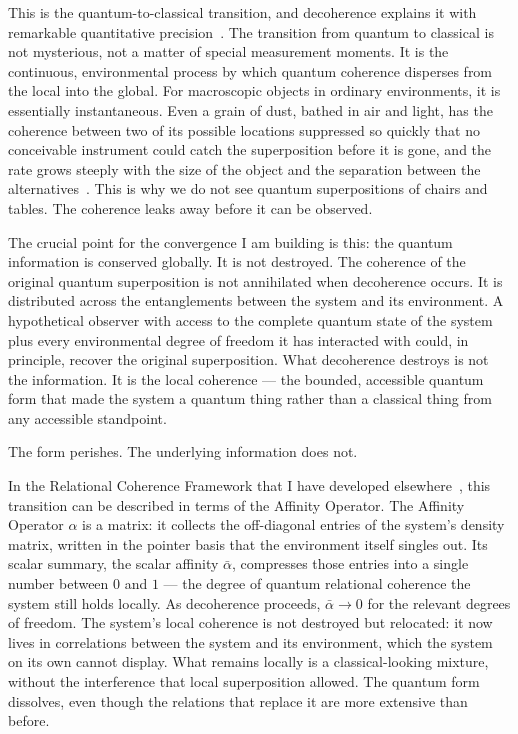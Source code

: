 This is the quantum-to-classical transition, and decoherence explains it with remarkable quantitative precision~\citep{Zurek2003}.
The transition from quantum to classical is not mysterious, not a matter of special measurement moments.
It is the continuous, environmental process by which quantum coherence disperses from the local into the global.
For macroscopic objects in ordinary environments, it is essentially instantaneous.
Even a grain of dust, bathed in air and light, has the coherence between two of its possible locations suppressed so quickly that no conceivable instrument could catch the superposition before it is gone, and the rate grows steeply with the size of the object and the separation between the alternatives~\citep{Zurek2003}.
This is why we do not see quantum superpositions of chairs and tables.
The coherence leaks away before it can be observed.

The crucial point for the convergence I am building is this: the quantum information is conserved globally.
It is not destroyed.
The coherence of the original quantum superposition is not annihilated when decoherence occurs.
It is distributed across the entanglements between the system and its environment.
A hypothetical observer with access to the complete quantum state of the system plus every environmental degree of freedom it has interacted with could, in principle, recover the original superposition.
What decoherence destroys is not the information.
It is the local coherence --- the bounded, accessible quantum form that made the system a quantum thing rather than a classical thing from any accessible standpoint.

The form perishes.
The underlying information does not.

In the Relational Coherence Framework that I have developed elsewhere~\citep{AdamsRCT}, this transition can be described in terms of the Affinity Operator.
The Affinity Operator $\alpha$ is a matrix: it collects the off-diagonal entries of the system's density matrix, written in the pointer basis that the environment itself singles out.
Its scalar summary, the scalar affinity $\bar{\alpha}$, compresses those entries into a single number between $0$ and $1$ --- the degree of quantum relational coherence the system still holds locally.
As decoherence proceeds, $\bar{\alpha} \to 0$ for the relevant degrees of freedom.
The system's local coherence is not destroyed but relocated: it now lives in correlations between the system and its environment, which the system on its own cannot display.
What remains locally is a classical-looking mixture, without the interference that local superposition allowed.
The quantum form dissolves, even though the relations that replace it are more extensive than before.

